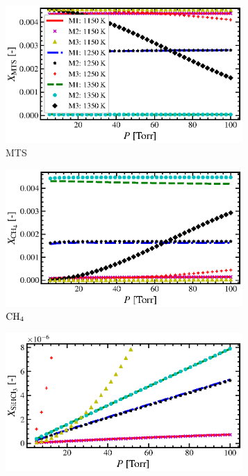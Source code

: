 \documentclass[final, letterpaper, square, comma, numbers, sort&compress]{elsarticle}
\begin{document}
\begin{figure}
    \centering
    \begin{subfigure}{0.49\textwidth}
        \centering
        \includegraphics[width=0.99\textwidth]{P-vs-MTS-compare}
        \caption{MTS}
    \end{subfigure}
    \begin{subfigure}{0.49\textwidth}
        \centering
        \includegraphics[width=0.99\textwidth]{P-vs-CH4-compare}
        \caption{$\rm CH_4$}
    \end{subfigure}
    \begin{subfigure}{0.49\textwidth}
        \centering
        \includegraphics[width=0.99\textwidth]{P-vs-SiHCl3-compare}

\end{subfigure}
\end{figure}
\end{document}
